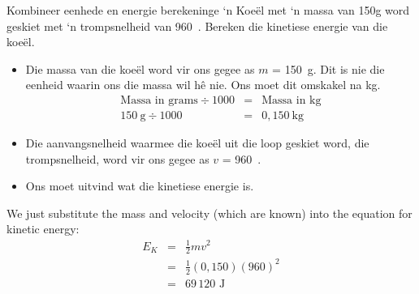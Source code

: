       \noindent
\begin{wex}{Kombineer eenhede en energie berekeninge }{‘n Koe\"{e}l met ‘n massa van 150g word geskiet met ‘n trompsnelheid van 960~\ms. Bereken die kinetiese energie van die koe\"{e}l.}
{
\begin{itemize}
\item Die massa van die koe\"{e}l word vir ons gegee as $m$ = 150~g. Dit is nie die eenheid waarin ons die massa wil h\^{e} nie. Ons moet dit omskakel na kg.
\begin{eqnarray*}
\text{Massa in grams} \div 1000 &=& \text{Massa in kg}\\
150~\text{g} \div 1000 &=& 0,150~\text{kg}
\end{eqnarray*}

\item Die aanvangsnelheid waarmee die koe\"{e}l uit die loop geskiet word, die trompsnelheid, word vir ons gegee as $v$ = 960~\ms.
\end{itemize}
\begin{itemize}
\item Ons moet uitvind wat die kinetiese energie is.
\end{itemize}

We just substitute the mass and velocity (which are known) into the equation for kinetic energy:
\begin{eqnarray*}
E_{K} & = & \frac{1}{2}mv^2 \\
&= & \frac{1}{2}(0,150)(960)^2 \\
&=& 69\,120 \text{ J}
\end{eqnarray*}}
\end{wex}
    \noindent
\label{m38785*secfhsst!!!underscore!!!id1491}
